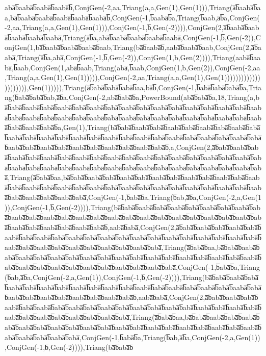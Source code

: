 aba̅b̅aaba̅b̅aaba̅b̅aaba̅b̅,ConjGen(-2,aa,Triang(a,a,Gen(1),Gen(1))),Triang(a̅b̅aaba̅b̅aa,ba̅b̅aaba̅b̅aaba̅b̅aaba̅b̅aaba̅b̅aaba̅b̅,ConjGen(-1,b̅aaba̅b̅a,Triang(b̅aab,a̅b̅a,ConjGen(-2,aa,Triang(a,a,Gen(1),Gen(1))),ConjGen(-1,b̅,Gen(-2)))),ConjGen(2,a̅b̅aaba̅b̅aaba̅b̅aaba̅b̅aaba̅b̅aaba̅,Triang(a̅b̅a,aba̅b̅aaba̅b̅aaba̅b̅aaba̅b̅aaba̅,ConjGen(-1,b̅,Gen(-2)),ConjGen(1,ba̅b̅aaba̅b̅aaba̅b̅aaba̅b̅aab,Triang(ba̅b̅aaba̅b̅,aaba̅b̅aaba̅b̅aab,ConjGen(2,a̅b̅aaba̅,Triang(a̅b̅a,aba̅,ConjGen(-1,b̅,Gen(-2)),ConjGen(1,b,Gen(2)))),Triang(aaba̅b̅aaba̅,b̅aab,ConjGen(1,aba̅b̅aab,Triang(aba̅,b̅aab,ConjGen(1,b,Gen(2)),ConjGen(-2,aa,Triang(a,a,Gen(1),Gen(1))))),ConjGen(-2,aa,Triang(a,a,Gen(1),Gen(1))))))))))))))))))))),Gen(1))))),Triang(a̅b̅aba̅b̅aba̅b̅aba̅b̅aa,ba̅b̅,ConjGen(-1,b̅aba̅b̅aba̅b̅aba̅b̅a,Triang(b̅aba̅b̅aba̅b̅ab,a̅b̅a,ConjGen(-2,aba̅b̅aba̅b̅a,PowerBound(aba̅b̅aba̅b̅a,18,Triang(a,ba̅b̅aba̅b̅aaba̅b̅aba̅b̅aaba̅b̅aba̅b̅aaba̅b̅aba̅b̅aaba̅b̅aba̅b̅aaba̅b̅aba̅b̅aaba̅b̅aba̅b̅aaba̅b̅aba̅b̅aaba̅b̅aba̅b̅aaba̅b̅aba̅b̅aaba̅b̅aba̅b̅aaba̅b̅aba̅b̅aaba̅b̅aba̅b̅aaba̅b̅aba̅b̅aaba̅b̅aba̅b̅aaba̅b̅aba̅b̅aaba̅b̅aba̅b̅aaba̅b̅aba̅b̅a,Gen(1),Triang(ba̅b̅aba̅b̅aaba̅b̅aba̅b̅aaba̅b̅aba̅b̅aaba̅b̅aba̅b̅aaba̅b̅aba̅b̅aaba̅b̅aba̅b̅aaba̅b̅aba̅b̅aaba̅b̅aba̅b̅aaba̅b̅aba̅b̅aaba̅b̅aba̅b̅aaba̅b̅aba̅b̅aaba̅b̅aba̅b̅aaba̅b̅aba̅b̅aaba̅b̅aba̅b̅aaba̅b̅aba̅b̅aaba̅b̅aba̅b̅aaba̅b̅aba̅b̅aaba̅b̅aba̅b̅,a,ConjGen(2,a̅b̅aba̅b̅aaba̅b̅aba̅b̅aaba̅b̅aba̅b̅aaba̅b̅aba̅b̅aaba̅b̅aba̅b̅aaba̅b̅aba̅b̅aaba̅b̅aba̅b̅aaba̅b̅aba̅b̅aaba̅b̅aba̅b̅aaba̅b̅aba̅b̅aaba̅b̅aba̅b̅aaba̅b̅aba̅b̅aaba̅b̅aba̅b̅aaba̅b̅aba̅b̅aaba̅b̅aba̅b̅aaba̅b̅aba̅b̅aaba̅b̅aba̅b̅aaba̅b̅aba̅,Triang(a̅b̅aba̅b̅aa,ba̅b̅aba̅b̅aaba̅b̅aba̅b̅aaba̅b̅aba̅b̅aaba̅b̅aba̅b̅aaba̅b̅aba̅b̅aaba̅b̅aba̅b̅aaba̅b̅aba̅b̅aaba̅b̅aba̅b̅aaba̅b̅aba̅b̅aaba̅b̅aba̅b̅aaba̅b̅aba̅b̅aaba̅b̅aba̅b̅aaba̅b̅aba̅b̅aaba̅b̅aba̅b̅aaba̅b̅aba̅b̅aaba̅b̅aba̅b̅aaba̅b̅aba̅,ConjGen(-1,b̅aba̅b̅a,Triang(b̅ab,a̅b̅a,ConjGen(-2,a,Gen(1)),ConjGen(-1,b̅,Gen(-2)))),Triang(ba̅b̅aba̅b̅aaba̅b̅aba̅b̅aaba̅b̅aba̅b̅aaba̅b̅aba̅b̅aaba̅b̅aba̅b̅aaba̅b̅aba̅b̅aaba̅b̅aba̅b̅aaba̅b̅aba̅b̅aaba̅b̅aba̅b̅aaba̅b̅aba̅b̅aaba̅b̅aba̅b̅aaba̅b̅aba̅b̅aaba̅b̅aba̅b̅aaba̅b̅aba̅b̅aaba̅b̅aba̅b̅aaba̅b̅aba̅b̅,aaba̅b̅aba̅,ConjGen(2,a̅b̅aba̅b̅aaba̅b̅aba̅b̅aaba̅b̅aba̅b̅aaba̅b̅aba̅b̅aaba̅b̅aba̅b̅aaba̅b̅aba̅b̅aaba̅b̅aba̅b̅aaba̅b̅aba̅b̅aaba̅b̅aba̅b̅aaba̅b̅aba̅b̅aaba̅b̅aba̅b̅aaba̅b̅aba̅b̅aaba̅b̅aba̅b̅aaba̅b̅aba̅b̅aaba̅b̅aba̅b̅aaba̅b̅aba̅,Triang(a̅b̅aba̅b̅aa,ba̅b̅aba̅b̅aaba̅b̅aba̅b̅aaba̅b̅aba̅b̅aaba̅b̅aba̅b̅aaba̅b̅aba̅b̅aaba̅b̅aba̅b̅aaba̅b̅aba̅b̅aaba̅b̅aba̅b̅aaba̅b̅aba̅b̅aaba̅b̅aba̅b̅aaba̅b̅aba̅b̅aaba̅b̅aba̅b̅aaba̅b̅aba̅b̅aaba̅b̅aba̅b̅aaba̅b̅aba̅,ConjGen(-1,b̅aba̅b̅a,Triang(b̅ab,a̅b̅a,ConjGen(-2,a,Gen(1)),ConjGen(-1,b̅,Gen(-2)))),Triang(ba̅b̅aba̅b̅aaba̅b̅aba̅b̅aaba̅b̅aba̅b̅aaba̅b̅aba̅b̅aaba̅b̅aba̅b̅aaba̅b̅aba̅b̅aaba̅b̅aba̅b̅aaba̅b̅aba̅b̅aaba̅b̅aba̅b̅aaba̅b̅aba̅b̅aaba̅b̅aba̅b̅aaba̅b̅aba̅b̅aaba̅b̅aba̅b̅aaba̅b̅aba̅b̅,aaba̅b̅aba̅,ConjGen(2,a̅b̅aba̅b̅aaba̅b̅aba̅b̅aaba̅b̅aba̅b̅aaba̅b̅aba̅b̅aaba̅b̅aba̅b̅aaba̅b̅aba̅b̅aaba̅b̅aba̅b̅aaba̅b̅aba̅b̅aaba̅b̅aba̅b̅aaba̅b̅aba̅b̅aaba̅b̅aba̅b̅aaba̅b̅aba̅b̅aaba̅b̅aba̅b̅aaba̅b̅aba̅,Triang(a̅b̅aba̅b̅aa,ba̅b̅aba̅b̅aaba̅b̅aba̅b̅aaba̅b̅aba̅b̅aaba̅b̅aba̅b̅aaba̅b̅aba̅b̅aaba̅b̅aba̅b̅aaba̅b̅aba̅b̅aaba̅b̅aba̅b̅aaba̅b̅aba̅b̅aaba̅b̅aba̅b̅aaba̅b̅aba̅b̅aaba̅b̅aba̅b̅aaba̅b̅aba̅,ConjGen(-1,b̅aba̅b̅a,Triang(b̅ab,a̅b̅a,ConjGen(-2,a,Gen(1)),ConjGen(-1,b̅,Gen(-2)))),Triang(ba̅b̅aba̅b̅